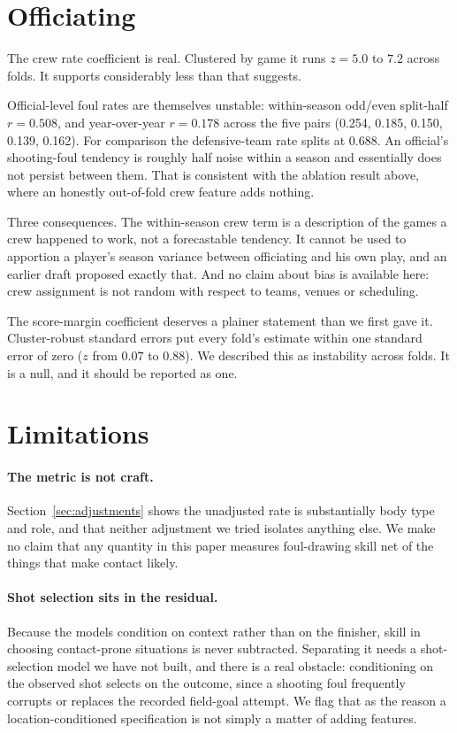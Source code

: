 \documentclass[11pt,letterpaper]{article}
\begin{document}
\section{Officiating}
\label{sec:officiating}

The crew rate coefficient is real. Clustered by game it runs $z = 5.0$ to $7.2$
across folds. It supports considerably less than that suggests.

Official-level foul rates are themselves unstable: within-season odd/even
split-half $r = 0.508$, and year-over-year $r = 0.178$ across the five pairs
(0.254, 0.185, 0.150, 0.139, 0.162). For comparison the defensive-team rate
splits at $0.688$. An official's shooting-foul tendency is roughly half noise
within a season and essentially does not persist between them. That is consistent
with the ablation result above, where an honestly out-of-fold crew feature adds
nothing.

Three consequences. The within-season crew term is a description of the games a
crew happened to work, not a forecastable tendency. It cannot be used to
apportion a player's season variance between officiating and his own play, and an
earlier draft proposed exactly that. And no claim about bias is available here:
crew assignment is not random with respect to teams, venues or scheduling.

The score-margin coefficient deserves a plainer statement than we first gave it.
Cluster-robust standard errors put every fold's estimate within one standard error
of zero ($z$ from $0.07$ to $0.88$). We described this as instability across
folds. It is a null, and it should be reported as one.

\section{Limitations}
\label{sec:limitations}

\paragraph{The metric is not craft.} Section~\ref{sec:adjustments} shows the
unadjusted rate is substantially body type and role, and that neither adjustment
we tried isolates anything else. We make no claim that any quantity in this paper
measures foul-drawing skill net of the things that make contact likely.

\paragraph{Shot selection sits in the residual.} Because the models condition on
context rather than on the finisher, skill in choosing contact-prone situations is
never subtracted. Separating it needs a shot-selection model
\citep{sandholtz2020measuring} we have not built, and there is a real obstacle:
conditioning on the observed shot selects on the outcome, since a shooting foul
frequently corrupts or replaces the recorded field-goal attempt. We flag that as
the reason a location-conditioned specification is not simply a matter of adding
features.
\end{document}
